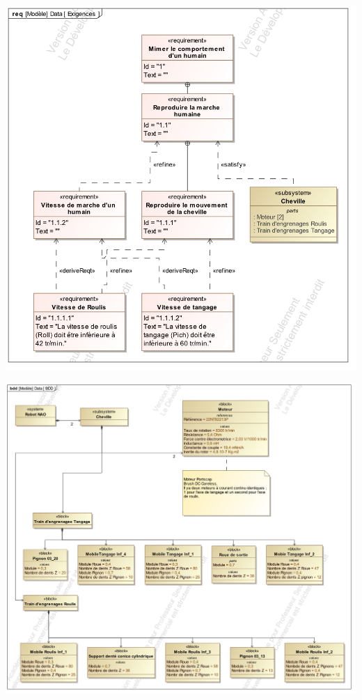 \documentclass[10pt]{article}
\newif\ifprof
\begin{document}
\ifprof
\else
\begin{minipage}[c]{.5\linewidth}
\begin{center}
\includegraphics[width=.95\textwidth]{images/Req}
\end{center}
\end{minipage} \hfill
\begin{minipage}[c]{.5\linewidth}
\begin{center}
\includegraphics[width=\textwidth]{images/BDD}
\end{center}
\end{minipage}
\end{document}
